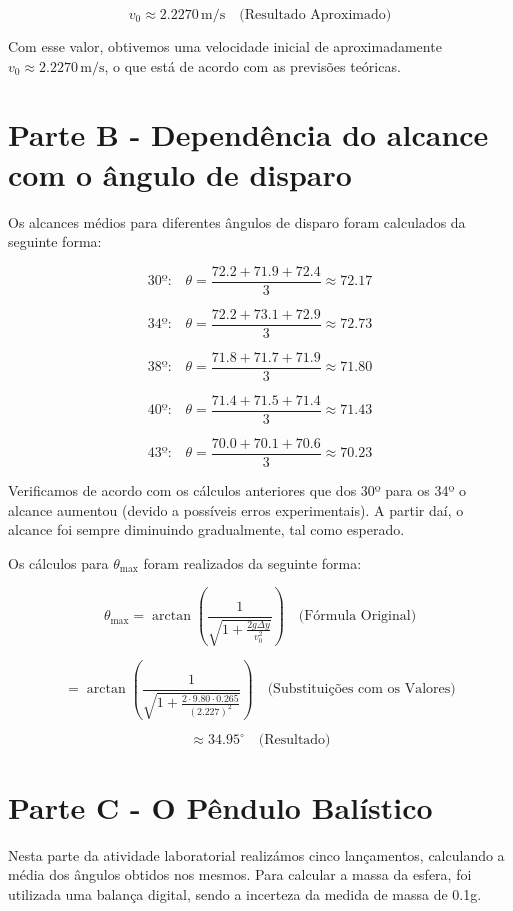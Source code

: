 \documentclass{report}
\begin{document}
\[
v_0 \approx 2.2270 \, \text{m/s} \quad \text{(Resultado Aproximado)}
\]

Com esse valor, obtivemos uma velocidade inicial de aproximadamente \(v_0 \approx 2.2270 \, \text{m/s}\), o que está de acordo com as previsões teóricas.



\section{Parte B - Dependência do alcance com o ângulo de disparo}

Os alcances médios para diferentes ângulos de disparo foram calculados da seguinte forma:

\[
\text{30º:} \quad \theta = \frac{72.2 + 71.9 + 72.4}{3} \approx 72.17
\]

\[
\text{34º:} \quad \theta = \frac{72.2 + 73.1 + 72.9}{3} \approx 72.73
\]

\[
\text{38º:} \quad \theta = \frac{71.8 + 71.7 + 71.9}{3} \approx 71.80
\]

\[
\text{40º:} \quad \theta = \frac{71.4 + 71.5 + 71.4}{3} \approx 71.43
\]

\[
\text{43º:} \quad \theta = \frac{70.0 + 70.1 + 70.6}{3} \approx 70.23
\]

Verificamos de acordo com os cálculos anteriores que dos 30º para os 34º o alcance aumentou (devido a possíveis erros experimentais). A partir daí, o alcance foi sempre diminuindo gradualmente, tal como esperado.

Os cálculos para \(\theta_{\text{max}}\) foram realizados da seguinte forma:

\[
\theta_{\text{max}} = \arctan \left( \frac{1}{\sqrt{1 + \frac{2g \Delta y}{v_0^2}}} \right)
\quad \text{(Fórmula Original)}
\]

\[
= \arctan \left( \frac{1}{\sqrt{1 + \frac{2 \cdot 9.80 \cdot 0.265}{(2.227)^2}}} \right)
\quad \text{(Substituições com os Valores)}
\]

\[
\approx 34.95^\circ
\quad \text{(Resultado)}
\]


\section{Parte C - O Pêndulo Balístico}

Nesta parte da atividade laboratorial realizámos cinco lançamentos, calculando a média dos ângulos obtidos nos mesmos. Para calcular a massa da esfera, foi utilizada uma balança digital, sendo a incerteza da medida de massa de 0.1g.
\end{document}
